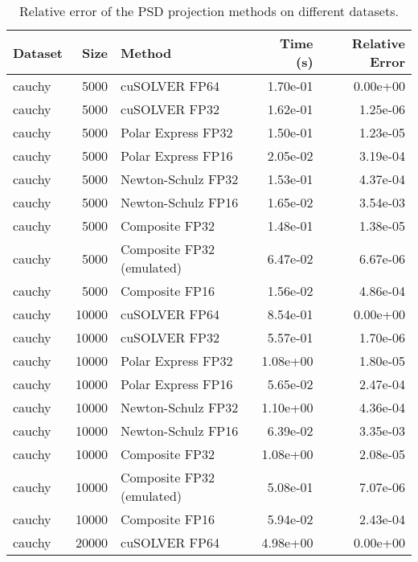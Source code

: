\begin{table}
\centering
\caption{Relative error of the PSD projection methods on different datasets.}
\label{tab:benchmark_error}
\begin{tabular}{lrlrr}
\toprule
  Dataset &  Size &                    Method &  Time (s) &  Relative Error \\
\midrule
   cauchy &  5000 &             cuSOLVER FP64 &  1.70e-01 &        0.00e+00 \\
   cauchy &  5000 &             cuSOLVER FP32 &  1.62e-01 &        1.25e-06 \\
   cauchy &  5000 &        Polar Express FP32 &  1.50e-01 &        1.23e-05 \\
   cauchy &  5000 &        Polar Express FP16 &  2.05e-02 &        3.19e-04 \\
   cauchy &  5000 &        Newton-Schulz FP32 &  1.53e-01 &        4.37e-04 \\
   cauchy &  5000 &        Newton-Schulz FP16 &  1.65e-02 &        3.54e-03 \\
   cauchy &  5000 &            Composite FP32 &  1.48e-01 &        1.38e-05 \\
   cauchy &  5000 & Composite FP32 (emulated) &  6.47e-02 &        6.67e-06 \\
   cauchy &  5000 &            Composite FP16 &  1.56e-02 &        4.86e-04 \\
   cauchy & 10000 &             cuSOLVER FP64 &  8.54e-01 &        0.00e+00 \\
   cauchy & 10000 &             cuSOLVER FP32 &  5.57e-01 &        1.70e-06 \\
   cauchy & 10000 &        Polar Express FP32 &  1.08e+00 &        1.80e-05 \\
   cauchy & 10000 &        Polar Express FP16 &  5.65e-02 &        2.47e-04 \\
   cauchy & 10000 &        Newton-Schulz FP32 &  1.10e+00 &        4.36e-04 \\
   cauchy & 10000 &        Newton-Schulz FP16 &  6.39e-02 &        3.35e-03 \\
   cauchy & 10000 &            Composite FP32 &  1.08e+00 &        2.08e-05 \\
   cauchy & 10000 & Composite FP32 (emulated) &  5.08e-01 &        7.07e-06 \\
   cauchy & 10000 &            Composite FP16 &  5.94e-02 &        2.43e-04 \\
   cauchy & 20000 &             cuSOLVER FP64 &  4.98e+00 &        0.00e+00 \\

\end{tabular}
\end{table}
